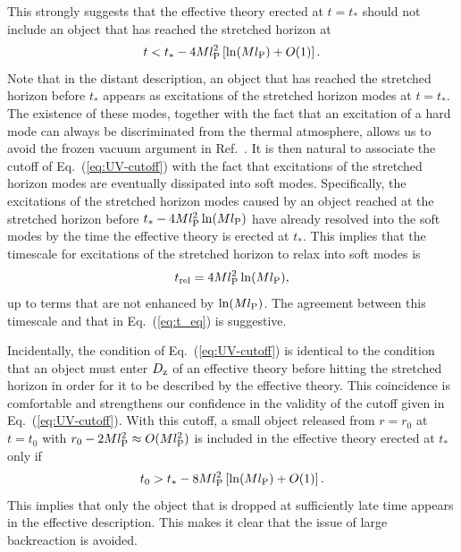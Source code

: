 \documentclass[12pt]{article}
\begin{document}
This strongly suggests that the effective theory erected at $t = t_*$ 
should not include an object that has reached the stretched horizon 
at
%
\begin{equation}
  t < t_* - 4Ml_{\rm P}^2 \left[ \ln(Ml_{\rm P}) + O(1) \right].
\label{eq:UV-cutoff}
\end{equation}
%
Note that in the distant description, an object that has reached the 
stretched horizon before $t_*$ appears as excitations of the stretched 
horizon modes at $t = t_*$.  The existence of these modes, together 
with the fact that an excitation of a hard mode can always be 
discriminated from the thermal atmosphere, allows us to avoid 
the frozen vacuum argument in Ref.~\cite{Bousso:2013ifa}.  It 
is then natural to associate the cutoff of Eq.~(\ref{eq:UV-cutoff}) 
with the fact that excitations of the stretched horizon modes are 
eventually dissipated into soft modes.  Specifically, the excitations 
of the stretched horizon modes caused by an object reached at the 
stretched horizon before $t_* - 4Ml_{\rm P}^2 \ln(Ml_{\rm P})$ 
have already resolved into the soft modes by the time the effective 
theory is erected at $t_*$.  This implies that the timescale for 
excitations of the stretched horizon to relax into soft modes is
%
\begin{equation}
  t_{\rm rel} = 4Ml_{\rm P}^2 \ln(Ml_{\rm P}),
\label{eq:t_rel}
\end{equation}
%
up to terms that are not enhanced by $\ln(Ml_{\rm P})$.  The agreement 
between this timescale and that in Eq.~(\ref{eq:t_eq}) is suggestive.

Incidentally, the condition of Eq.~(\ref{eq:UV-cutoff}) is identical 
to the condition that an object must enter $D_{\rm z}$ of an 
effective theory before hitting the stretched horizon in order 
for it to be described by the effective theory.  This coincidence 
is comfortable and strengthens our confidence in the validity of 
the cutoff given in Eq.~(\ref{eq:UV-cutoff}).  With this cutoff, 
a small object released from $r = r_0$ at $t = t_0$ with $r_0 - 
2Ml_{\rm P}^2 \approx O(Ml_{\rm P}^2)$ is included in the effective 
theory erected at $t_*$ only if
%
\begin{equation}
  t_0 > t_* -8Ml_{\rm P}^2 \left[ \ln(Ml_{\rm P}) + O(1) \right].
\label{eq:t0-cond}
\end{equation}
%
This implies that only the object that is dropped at sufficiently 
late time appears in the effective description.  This makes it clear 
that the issue of large backreaction is avoided.
\end{document}
